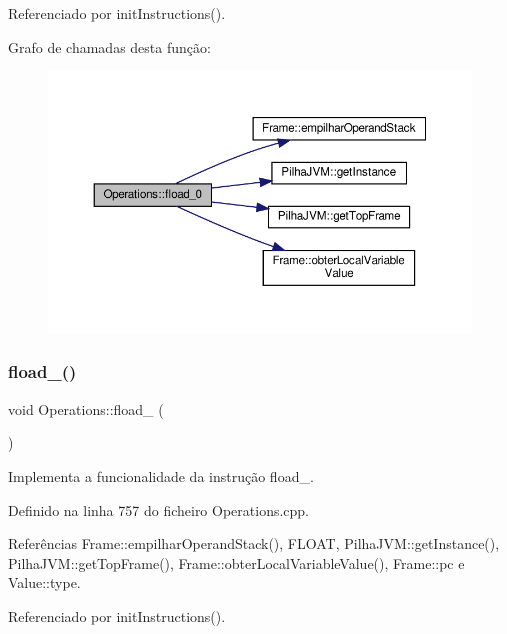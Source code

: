 Referenciado por init\+Instructions().

Grafo de chamadas desta função\+:\nopagebreak
\begin{figure}[H]
\begin{center}
\leavevmode
\includegraphics[width=350pt]{classOperations_a844c8a8d812c4f78c8f1024bbdac0548_cgraph}
\end{center}
\end{figure}
\mbox{\label{classOperations_a71611bd9fa43e8e170a35f3a5e1f0572}} 
\subsubsection{\texorpdfstring{fload\+\_()}{fload\_1()}}
{\footnotesize\ttfamily void Operations\+::fload\+\_ (\begin{DoxyParamCaption}{ }\end{DoxyParamCaption})\hspace{0.3cm}{\ttfamily [private]}}



Implementa a funcionalidade da instrução fload\+\_. 



Definido na linha 757 do ficheiro Operations.\+cpp.



Referências Frame\+::empilhar\+Operand\+Stack(), F\+L\+O\+AT, Pilha\+J\+V\+M\+::get\+Instance(), Pilha\+J\+V\+M\+::get\+Top\+Frame(), Frame\+::obter\+Local\+Variable\+Value(), Frame\+::pc e Value\+::type.



Referenciado por init\+Instructions().

